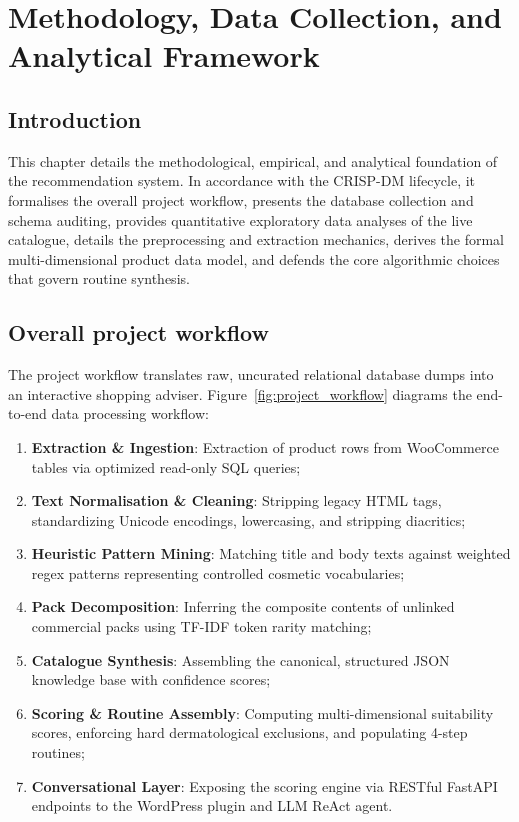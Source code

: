 ﻿%

\chapter{Methodology, Data Collection, and Analytical Framework}

\section{Introduction}

This chapter details the methodological, empirical, and analytical foundation of the recommendation system. In accordance with the CRISP-DM lifecycle, it formalises the overall project workflow, presents the database collection and schema auditing, provides quantitative exploratory data analyses of the live catalogue, details the preprocessing and extraction mechanics, derives the formal multi-dimensional product data model, and defends the core algorithmic choices that govern routine synthesis.

\section{Overall project workflow}

The project workflow translates raw, uncurated relational database dumps into an interactive shopping adviser. Figure~\ref{fig:project_workflow} diagrams the end-to-end data processing workflow:
\begin{enumerate}
  \item \textbf{Extraction \& Ingestion}: Extraction of product rows from WooCommerce tables via optimized read-only SQL queries;
  \item \textbf{Text Normalisation \& Cleaning}: Stripping legacy HTML tags, standardizing Unicode encodings, lowercasing, and stripping diacritics;
  \item \textbf{Heuristic Pattern Mining}: Matching title and body texts against weighted regex patterns representing controlled cosmetic vocabularies;
  \item \textbf{Pack Decomposition}: Inferring the composite contents of unlinked commercial packs using TF-IDF token rarity matching;
  \item \textbf{Catalogue Synthesis}: Assembling the canonical, structured JSON knowledge base with confidence scores;
  \item \textbf{Scoring \& Routine Assembly}: Computing multi-dimensional suitability scores, enforcing hard dermatological exclusions, and populating 4-step routines;
  \item \textbf{Conversational Layer}: Exposing the scoring engine via RESTful FastAPI endpoints to the WordPress plugin and LLM ReAct agent.
\end{enumerate}

